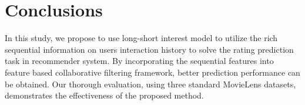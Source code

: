 \documentclass{llncs}
\begin{document}
\section{Conclusions}
In this study, we propose to use long-short interest model to utilize the rich
sequential information on users interaction history to solve the rating
prediction task in recommender system.
By incorporating the sequential features into feature based collaborative
filtering framework, better prediction performance can be obtained.
Our thorough evaluation, using three standard MovieLens datasets, demonstrates
the effectiveness of the proposed method.



\end{document}
